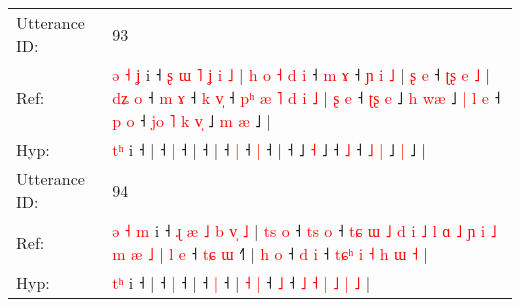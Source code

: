 \documentclass[10pt]{article}
\DeclareRobustCommand{\hl}[1]{{\textcolor{red}{#1}}}
\begin{document}
\begin{longtable}{ll}
 \\
\midrule
Utterance ID: & 93 \\
Ref: & \hl{ə}\hl{ }\hl{˧}\hl{ }\hl{ʝ} i ˧\hl{ }\hl{ʂ}\hl{ }\hl{ɯ}\hl{ }\hl{˥}\hl{ }\hl{ʝ}\hl{ }\hl{i}\hl{ }\hl{˩} |\hl{ }\hl{h}\hl{ }\hl{o}\hl{ }\hl{˧}\hl{ }\hl{d}\hl{ }\hl{i} ˧\hl{ }\hl{m} \hl{ɤ} ˧\hl{ }\hl{ɲ}\hl{ }\hl{i}\hl{ }\hl{˩} |\hl{ }\hl{ʂ}\hl{ }\hl{e} ˧\hl{ }\hl{ʈ}\hl{ʂ}\hl{ }\hl{e}\hl{ }\hl{˩} |\hl{ }\hl{d}\hl{ʑ}\hl{ }\hl{o} ˧\hl{ }\hl{m} \hl{ɤ} ˧\hl{ }\hl{k} \hl{v}\hl{̩} ˧\hl{ }\hl{p}\hl{ʰ}\hl{ }\hl{æ}\hl{ }\hl{˥}\hl{ }\hl{d}\hl{ }\hl{i}\hl{ }\hl{˩} |\hl{ }\hl{ʂ}\hl{ }\hl{e} ˧\hl{ }\hl{ʈ}\hl{ʂ}\hl{ }\hl{e} ˩\hl{ }\hl{h} \hl{w}\hl{æ} ˩\hl{ }\hl{|}\hl{ }\hl{l}\hl{ }\hl{e} ˧\hl{ }\hl{p} \hl{o} ˧\hl{ }\hl{j}\hl{o}\hl{ }\hl{˥} \hl{k} \hl{v}\hl{̩} ˩\hl{ }\hl{m} \hl{æ} ˩ |
 \\
Hyp: & \hl{}\hl{}\hl{}\hl{t}\hl{ʰ} i ˧\hl{}\hl{}\hl{}\hl{}\hl{}\hl{}\hl{}\hl{}\hl{}\hl{}\hl{}\hl{} |\hl{}\hl{}\hl{}\hl{}\hl{}\hl{}\hl{}\hl{}\hl{}\hl{} ˧\hl{}\hl{} \hl{|} ˧\hl{}\hl{}\hl{}\hl{}\hl{}\hl{} |\hl{}\hl{}\hl{}\hl{} ˧\hl{}\hl{}\hl{}\hl{}\hl{}\hl{}\hl{} |\hl{}\hl{}\hl{}\hl{}\hl{} ˧\hl{}\hl{} \hl{|} ˧\hl{}\hl{} \hl{}\hl{|} ˧\hl{}\hl{}\hl{}\hl{}\hl{}\hl{}\hl{}\hl{}\hl{}\hl{}\hl{}\hl{}\hl{} |\hl{}\hl{}\hl{}\hl{} ˧\hl{}\hl{}\hl{}\hl{}\hl{} ˩\hl{}\hl{} \hl{}\hl{˧} ˩\hl{}\hl{}\hl{}\hl{}\hl{}\hl{} ˧\hl{}\hl{} \hl{˩} ˧\hl{}\hl{}\hl{}\hl{}\hl{} \hl{˩} \hl{}\hl{|} ˩\hl{}\hl{} \hl{|} ˩ |
 \\
\midrule
Utterance ID: & 94 \\
Ref: & \hl{ə}\hl{ }\hl{˧}\hl{ }\hl{m} i ˧\hl{ }\hl{ɻ}\hl{ }\hl{æ}\hl{ }\hl{˩}\hl{ }\hl{b}\hl{ }\hl{v}\hl{̩}\hl{ }\hl{˩} |\hl{ }\hl{t}\hl{s}\hl{ }\hl{o} ˧\hl{ }\hl{t}\hl{s} \hl{o} ˧\hl{ }\hl{t}\hl{ɕ}\hl{ }\hl{ɯ}\hl{ }\hl{˩}\hl{ }\hl{d}\hl{ }\hl{i}\hl{ }\hl{˩}\hl{ }\hl{l}\hl{ }\hl{ɑ}\hl{ }\hl{˩}\hl{ }\hl{ɲ}\hl{ }\hl{i}\hl{ }\hl{˩}\hl{ }\hl{m}\hl{ }\hl{æ}\hl{ }\hl{˩} |\hl{ }\hl{l}\hl{ }\hl{e} ˧\hl{ }\hl{t}\hl{ɕ} \hl{ɯ} ˧\hl{˥} | \hl{h} \hl{o} ˧\hl{ }\hl{d} \hl{i} ˧ \hl{t}\hl{ɕ}\hl{ʰ} \hl{i} \hl{˧} \hl{h} \hl{ɯ} \hl{˧} |
 \\
Hyp: & \hl{}\hl{}\hl{}\hl{t}\hl{ʰ} i ˧\hl{}\hl{}\hl{}\hl{}\hl{}\hl{}\hl{}\hl{}\hl{}\hl{}\hl{}\hl{}\hl{} |\hl{}\hl{}\hl{}\hl{}\hl{} ˧\hl{}\hl{}\hl{} \hl{|} ˧\hl{}\hl{}\hl{}\hl{}\hl{}\hl{}\hl{}\hl{}\hl{}\hl{}\hl{}\hl{}\hl{}\hl{}\hl{}\hl{}\hl{}\hl{}\hl{}\hl{}\hl{}\hl{}\hl{}\hl{}\hl{}\hl{}\hl{}\hl{}\hl{}\hl{}\hl{} |\hl{}\hl{}\hl{}\hl{} ˧\hl{}\hl{}\hl{} \hl{|} ˧\hl{} | \hl{˧} \hl{|} ˧\hl{}\hl{} \hl{˩} ˧ \hl{}\hl{}\hl{˩} \hl{˧} \hl{|} \hl{˩} \hl{|} \hl{˩} |
 \\

\end{longtable}
\end{document}
